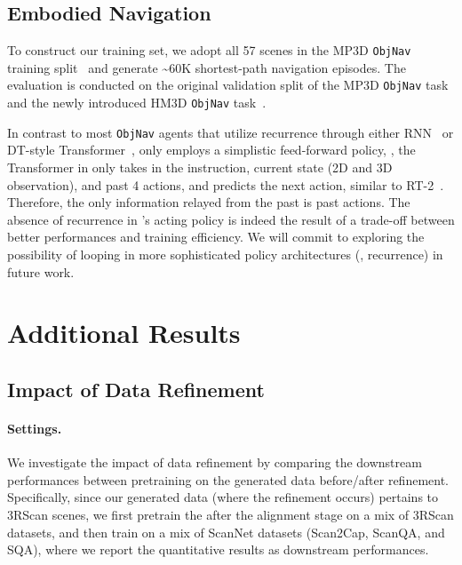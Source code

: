 \subsection{Embodied Navigation}\label{sec:supp_eai_split}
To construct our training set, we adopt all 57 scenes in the MP3D \texttt{ObjNav} training split~\citep{savva2019habitat,ramrakhya2022habitat} and generate \textasciitilde{}60K shortest-path navigation episodes. The evaluation is conducted on the original validation split of the MP3D \texttt{ObjNav} task and the newly introduced HM3D \texttt{ObjNav} task~\citep{ramakrishnan2021habitat}. 

In contrast to most \texttt{ObjNav} agents that utilize recurrence through either RNN~\citep{ramrakhya2022habitat} or DT-style Transformer~\citep{suglia2021embodied}, \agent only employs a simplistic feed-forward policy, \ie, the Transformer in \agent only takes in the instruction, current state (2D and 3D observation), and past 4 actions, and predicts the next action, similar to RT-2~\citep{brohan2023rt}. Therefore, the only information relayed from the past is past actions. The absence of recurrence in \agent's acting policy is indeed the result of a trade-off between better performances and training efficiency. We will commit to exploring the possibility of looping in more sophisticated policy architectures (\eg, recurrence) in future work.



 

\section{Additional Results}\label{sec:additional_results}

\subsection{Impact of Data Refinement}\label{sec:impact_data_refinement}
\paragraph{Settings.} We investigate the impact of data refinement by comparing the downstream performances between pretraining on the generated data before/after refinement. Specifically, since our generated data (where the refinement occurs) pertains to 3RScan scenes, we first pretrain the \agent after the alignment stage on a mix of 3RScan datasets, and then train on a mix of ScanNet datasets (Scan2Cap, ScanQA, and SQA), where we report the quantitative results as downstream performances.

